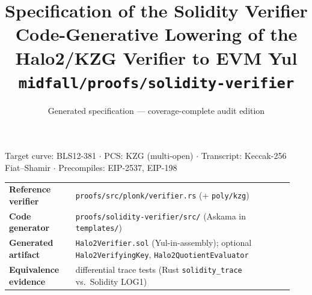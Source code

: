 \documentclass[11pt,a4paper]{report}
\title{\bfseries Specification of the Solidity Verifier\\[2pt]
\large Code-Generative Lowering of the Halo2/KZG Verifier to EVM Yul\\[6pt]
\normalsize \textcolor{black!60}{\texttt{midfall/proofs/solidity-verifier}}}
\author{Generated specification --- coverage-complete audit edition}
\date{}
\theoremstyle{definition}
\theoremstyle{plain}
\begin{document}
\maketitle
\vspace{-2.5em}
\begin{center}
\small\textcolor{black!60}{
Target curve: BLS12-381 \quad $\cdot$ \quad PCS: KZG (multi-open) \quad $\cdot$ \quad
Transcript: Keccak-256 Fiat--Shamir \quad $\cdot$ \quad Precompiles: EIP-2537, EIP-198}
\end{center}

\vfill
\begin{center}
\footnotesize
\begin{tabular}{@{}p{0.22\linewidth}p{0.72\linewidth}@{}}
\toprule
\textbf{Reference verifier} & \texttt{proofs/src/plonk/verifier.rs} (+ \texttt{poly/kzg}) \\
\textbf{Code generator} & \texttt{proofs/solidity-verifier/src/} (Askama in \texttt{templates/}) \\
\textbf{Generated artifact} & \texttt{Halo2Verifier.sol} (Yul-in-assembly); optional \texttt{Halo2VerifyingKey}, \texttt{Halo2QuotientEvaluator} \\
\textbf{Equivalence evidence} & differential trace tests (Rust \texttt{solidity\_trace} vs.\ Solidity LOG1) \\
\bottomrule
\end{tabular}
\end{center}
\vfill

\tableofcontents
\newpage















\end{document}
